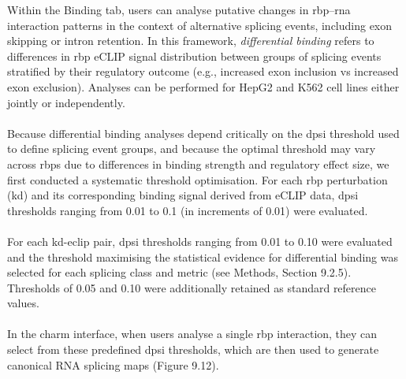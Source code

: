 Within the Binding tab, users can analyse putative changes in \gls{rbp}–\gls{rna} interaction patterns in the context of alternative splicing events, including exon skipping or intron retention. In this framework, \textit{differential binding} refers to differences in \gls{rbp} eCLIP signal distribution between groups of splicing events stratified by their regulatory outcome (e.g., increased exon inclusion \gls{vs} increased exon exclusion). Analyses can be performed for HepG2 and K562 cell lines either jointly or independently.
\\
\\
Because differential binding analyses depend critically on the \gls{dpsi} threshold used to define splicing event groups, and because the optimal threshold may vary across \glspl{rbp} due to differences in binding strength and regulatory effect size, we first conducted a systematic threshold optimisation. For each \gls{rbp} perturbation (\gls{kd}) and its corresponding binding signal derived from eCLIP data, \gls{dpsi} thresholds ranging from 0.01 to 0.1 (in increments of 0.01) were evaluated.
\\
\\
For each \gls{kd}-\gls{eclip} pair, \gls{dpsi} thresholds ranging from 0.01 to 0.10 were evaluated and the threshold maximising the statistical evidence for differential binding was selected for each splicing class and metric (see Methods, Section 9.2.5). Thresholds of 0.05 and 0.10 were additionally retained as standard reference values.
\\
\\
In the \gls{charm} interface, when users analyse a single \gls{rbp} interaction, they can select from these predefined \gls{dpsi} thresholds, which are then used to generate canonical RNA splicing maps (Figure 9.12).
